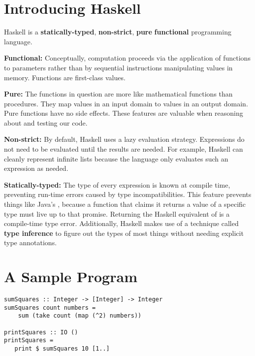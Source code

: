 \section{Introducing Haskell}
\begin{notelist}
\item Haskell is a \textbf{statically-typed}, \textbf{non-strict}, \textbf{pure} \textbf{functional}
      programming language.
	\begin{notelist}
	\item \textbf{Functional:} Conceptually, computation proceeds via the application of functions to parameters rather than by 
          sequential instructions manipulating values in memory. Functions are first-class values.
	\item \textbf{Pure:} The functions in question are more like mathematical functions than procedures. They map values in an input domain
          to values in an output domain. Pure functions have no side effects. These features are valuable when reasoning about
          and testing our code.
	\item \textbf{Non-strict:} By default, Haskell uses a lazy evaluation strategy. Expressions do not need to be evaluated until the 
          results are needed. For example, Haskell can cleanly represent infinite lists because the language only evaluates such
          an expression as needed.
    \item \textbf{Statically-typed:} The type of every expression is known at compile time, preventing run-time errors caused by type
          incompatibilities. This feature prevents things like Java's , because a function that claims it returns
          a value of a specific type must live up to that promise. Returning the Haskell equivalent of  is a compile-time
          type error. Additionally, Haskell makes use of a technique called \textbf{type inference} to figure out the types of most things
          without needing explicit type annotations.
	\end{notelist}
\end{notelist}
\pagebreak

\section{A Sample Program}

\begin{lstlisting}
sumSquares :: Integer -> [Integer] -> Integer
sumSquares count numbers =
    sum (take count (map (^2) numbers))

printSquares :: IO ()
printSquares =
   print $ sumSquares 10 [1..]
\end{lstlisting}


